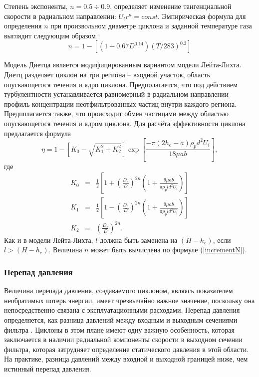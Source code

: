 			Степень экспоненты, $n = 0.5 \div 0.9$, определяет изменение тангенциальной скорости в радиальном направлении: $U_tr^n = const$. Эмпирическая формула для определения $n$ при произвольном диаметре циклона и заданной температуре газа выглядит следующим образом \cite{Alexander}:
			\begin{equation}
				\label{incrementN}
				n = 1 - \left[ (1-0.67D^{0.14})(T/283)^{0.3} \right]
			\end{equation}
			
			Модель Диетца \cite{Dietz} является модифицированным вариантом модели Лейта-Лихта. Диетц разделяет циклон на три региона -- входной участок, область опускающегося течения и ядро циклона. Предполагается, что под действием турбулентности устанавливается равномерный в радиальном направлении профиль концентрации неотфильтрованных частиц внутри каждого региона. Предполагается также, что происходит обмен частицами между областью опускающегося течения и ядром циклона. Для расчёта эффективности циклона предлагается формула
			\begin{equation}
				\eta = 1 - \left[ K_0 - \sqrt{K_1^2 + K_2^2} \right]\exp{\left[\frac{-\pi (2h_e - a)\rho_p d^2 U_i}{18 \mu ab}\right]},
			\end{equation}
			где 
			\begin{eqnarray}
				K_0 &=& \frac{1}{2}\left[ 1 + \left(\frac{D_e}{D}\right)^{2n}\left(1+\frac{9\mu ab}{ \pi \rho_p l d^2 U_i}\right) \right] \\
				K_1 &=& \frac{1}{2}\left[ 1 - \left(\frac{D_e}{D}\right)^{2n}\left(1+\frac{9\mu ab}{ \pi \rho_p l d^2 U_i}\right) \right] \\
				K_2 &=& \left(\frac{D_e}{D}\right)^{2n}.
			\end{eqnarray}
			Как и в модели Лейта-Лихта, $l$ должна быть заменена на $(H-h_e)$, если $l>(H-h_e)$. Величина $n$ может быть вычислена по формуле (\ref{incrementN}).
	\subsubsection*{Перепад давления}
		Величина перепада давления, создаваемого циклоном, являясь показателем необратимых потерь энергии, имеет чрезвычайно важное значение, поскольку она непосредственно связана с эксплуатационными расходами. Перепад давления определяется, как разница давлений между входным и выходным сечениями фильтра \cite{Utikar}. Циклоны в этом плане имеют одну важную особенность, которая заключается в наличии радиальной компоненты скорости в выходном сечении фильтра, которая затрудняет определение статического давления в этой области. На практике, разница давлений между входной и выходной границей ниже, чем истинный перепад давления.
		
